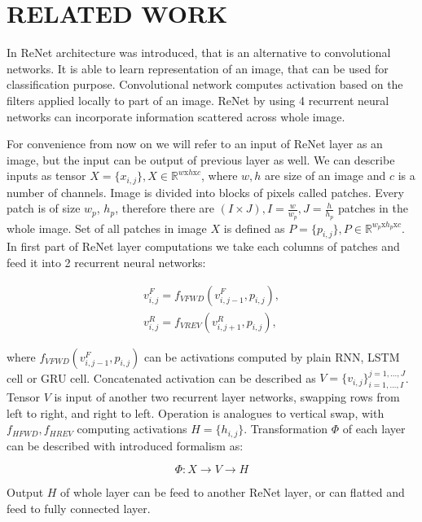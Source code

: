\documentclass[a4paper, 10 pt, journal]{ieeeconf}
\begin{document}
\section{RELATED WORK}

In \cite{DBLP:journals/corr/VisinKCMCB15} ReNet architecture was introduced, that is an alternative to convolutional networks. It is able to learn representation of an image, that can be used for classification purpose. Convolutional network computes activation based on the filters applied locally to part of an image. ReNet by using 4 recurrent neural networks can incorporate information scattered across whole image.

For convenience from now on we will refer to an input of ReNet layer as an image, but the input can be output of previous layer as well. We can describe inputs as tensor $X = \{x_{i,j}\}, X \in \mathbb{R}^{w \textrm{x} h \textrm{x} c}$, where $w, h$ are size of an image and $c$ is a number of channels. Image is divided into blocks of pixels called patches. Every patch is of size $w_p$, $h_p$, therefore there are $(I \times J),I=\frac{w}{w_p}, J=\frac{h}{h_p}$ patches in the whole image. Set of all patches in image $X$ is defined as $P = \{p_{i,j}\}, P \in \mathbb{R}^{w_p \textrm{x} h_p \textrm{x} c}$. In first part of ReNet layer computations we take each columns of patches and feed it into 2 recurrent neural networks: 

\begin{gather}
	v_{i,j}^{F} = f_{VFWD} (v_{i,j-1}^F, p_{i,j}), \\
    v_{i,j}^{R} = f_{VREV} (v_{i,j+1}^R, p_{i,j}),
\end{gather}

where $f_{VFWD} (v_{i,j-1}^F, p_{i,j})$ can be activations computed by plain RNN, LSTM cell or GRU cell. Concatenated activation can be described as $V = \{v_{i,j}\}_{i=1,...,I}^{j=1,...,J}$. Tensor $V$ is input of another two recurrent layer networks, swapping rows from left to right, and right to left. Operation is analogues to vertical swap, with $f_{HFWD}, f_{HREV}$ computing activations $H = \{h_{i,j}\}$. Transformation $\Phi$ of each layer can be described with introduced formalism as:

\begin{equation}
	\Phi: X \rightarrow V \rightarrow H
\end{equation}

Output $H$ of whole layer can be feed to another ReNet layer, or can flatted and feed to fully connected layer.
\end{document}

